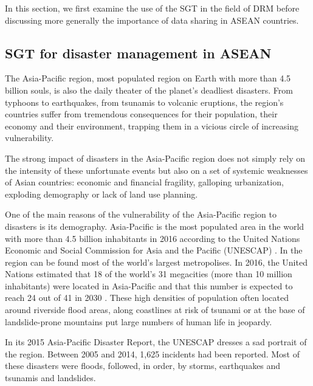 \vspace{0.4 cm}

In this section, we first examine the use of the SGT in the field of DRM before discussing more generally the importance of data sharing in ASEAN countries.

\subsection{SGT for disaster management in ASEAN}

\tab The Asia-Pacific region, most populated region on Earth with more than 4.5 billion souls, is also the daily theater of the planet's deadliest disasters. From typhoons to earthquakes, from tsunamis to volcanic eruptions, the region's countries suffer from tremendous consequences for their population, their economy and their environment, trapping them in a vicious circle of increasing vulnerability. 

The strong impact of disasters in the Asia-Pacific region does not simply rely on the intensity of these unfortunate events but also on a set of systemic weaknesses of Asian countries: economic and financial fragility, galloping urbanization, exploding demography or lack of land use planning.

\vspace{0.4 cm}

One of the main reasons of the vulnerability of the Asia-Pacific region to disasters is its demography. Asia-Pacific is the most populated area in the world with more than 4.5 billion inhabitants in 2016 according to the United Nations Economic and Social Commission for Asia and the Pacific (UNESCAP) \cite{PopulationDataSheet}. In the region can be found most of the world's largest metropolises. In 2016, the United Nations estimated that 18 of the world's 31 megacities (more than 10 million inhabitants) were located in Asia-Pacific and that this number is expected to reach 24 out of 41 in 2030 \cite{WorldCities}. These high densities of population often located around riverside flood areas, along coastlines at risk of tsunami or at the base of landslide-prone mountains put large numbers of human life in jeopardy.

\vspace{0.4 cm}

In its 2015 Asia-Pacific Disaster Report, the UNESCAP dresses a sad portrait of the region. Between 2005 and 2014, 1,625 incidents had been reported. Most of these disasters were floods, followed, in order, by storms, earthquakes and tsunamis and landslides.

